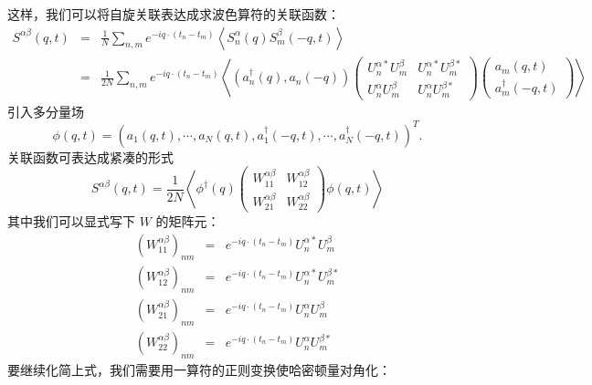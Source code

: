\documentclass[UTF8]{ctexart}
\begin{document}
这样，我们可以将自旋关联表达成求波色算符的关联函数：
\begin{eqnarray}
S^{\alpha\beta}\left(q,t\right) & = & \frac{1}{N}\sum_{n,m}e^{-iq\cdot\left(t_{n}-t_{m}\right)}\left\langle S_{n}^{\alpha}\left(q\right)S_{m}^{\beta}\left(-q,t\right)\right\rangle \nonumber \\
 & = & \frac{1}{2N}\sum_{n,m}e^{-iq\cdot\left(t_{n}-t_{m}\right)}\left\langle \left(a_{n}^{\dagger}\left(q\right),a_{n}\left(-q\right)\right)\left(\begin{array}{cc}
U_{n}^{\alpha*}U_{m}^{\beta} & U_{n}^{\alpha*}U_{m}^{\beta*}\\
U_{n}^{\alpha}U_{m}^{\beta} & U_{n}^{\alpha}U_{m}^{\beta*}
\end{array}\right)\left(\begin{array}{c}
a_{m}\left(q,t\right)\\
a_{m}^{\dagger}\left(-q,t\right)
\end{array}\right)\right\rangle 
\end{eqnarray}
引入多分量场
\begin{equation}
\phi\left(q,t\right)=\left(a_{1}\left(q,t\right),\cdots,a_{N}\left(q,t\right),a_{1}^{\dagger}\left(-q,t\right),\cdots,a_{N}^{\dagger}\left(-q,t\right)\right)^{T}.
\end{equation}
关联函数可表达成紧凑的形式
\begin{equation}
S^{\alpha\beta}\left(q,t\right)=\frac{1}{2N}\left\langle \phi^{\dagger}\left(q\right)\left(\begin{array}{cc}
W_{11}^{\alpha\beta} & W_{12}^{\alpha\beta}\\
W_{21}^{\alpha\beta} & W_{22}^{\alpha\beta}
\end{array}\right)\phi\left(q,t\right)\right\rangle 
\end{equation}
其中我们可以显式写下 $W$ 的矩阵元：
\begin{eqnarray}
\left(W_{11}^{\alpha\beta}\right)_{nm} & = & e^{-iq\cdot\left(t_{n}-t_{m}\right)}U_{n}^{\alpha*}U_{m}^{\beta}\\
\left(W_{12}^{\alpha\beta}\right)_{nm} & = & e^{-iq\cdot\left(t_{n}-t_{m}\right)}U_{n}^{\alpha*}U_{m}^{\beta*}\\
\left(W_{21}^{\alpha\beta}\right)_{nm} & = & e^{-iq\cdot\left(t_{n}-t_{m}\right)}U_{n}^{\alpha}U_{m}^{\beta}\\
\left(W_{22}^{\alpha\beta}\right)_{nm} & = & e^{-iq\cdot\left(t_{n}-t_{m}\right)}U_{n}^{\alpha}U_{m}^{\beta*}
\end{eqnarray}
要继续化简上式，我们需要用一算符的正则变换使哈密顿量对角化：
\end{document}
